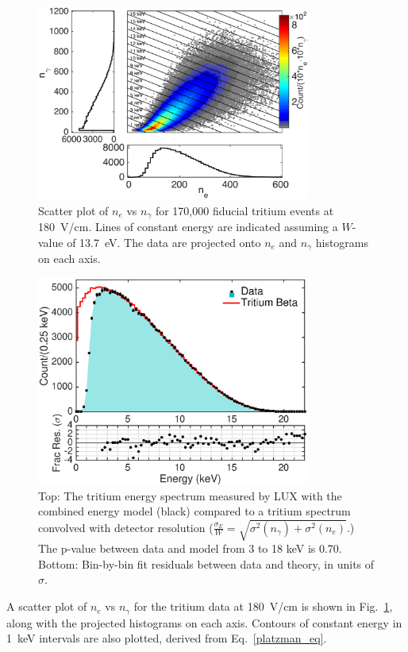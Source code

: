 \begin{figure}[t!]
\includegraphics[width=90mm]{fig/fig4.eps}
\caption{Scatter plot of $n_e$ vs $n_{\gamma}$ for 170,000 fiducial tritium events at 180~V/cm. Lines of constant energy are indicated assuming a $W$-value of 13.7~eV. The data are projected onto $n_e$ and $n_{\gamma}$ histograms on each axis.}
\label{fig:tritium-scatter}
\end{figure}


\begin{figure}[t!]
\begin{center}
\includegraphics[width=90mm]{fig/fig5.eps}
\caption{Top: The tritium energy spectrum measured by LUX with the combined energy model (black) compared to  a tritium spectrum convolved with detector resolution  ($\frac{\sigma_E}{W} = \sqrt{\sigma^2(n_{\gamma})+ \sigma^2(n_e)}$.) The p-value between data and model from 3 to 18 keV is 0.70. Bottom: Bin-by-bin fit residuals between data and theory, in units of $\sigma$. }
\label{fig:tritium-spectrum}
\end{center}
\end{figure}


A scatter plot of $n_e$ vs $n_{\gamma}$ for the tritium data at 180~V/cm is shown in Fig.~\ref{fig:tritium-scatter}, along with the projected histograms on each axis. Contours of constant energy in 1~keV intervals are also plotted, derived from Eq.~\ref{platzman_eq}. 

